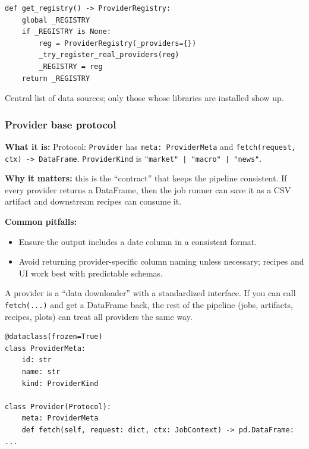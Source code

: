 \documentclass[11pt,a4paper]{article}
\begin{document}
\begin{lstlisting}
def get_registry() -> ProviderRegistry:
    global _REGISTRY
    if _REGISTRY is None:
        reg = ProviderRegistry(_providers={})
        _try_register_real_providers(reg)
        _REGISTRY = reg
    return _REGISTRY
\end{lstlisting}

\begin{intuitionbox}
Central list of data sources; only those whose libraries are installed show up.
\end{intuitionbox}

\subsubsection{Provider base protocol}\label{sec:provider-base}

\textbf{What it is:} Protocol: \texttt{Provider} has \texttt{meta: ProviderMeta} and \texttt{fetch(request, ctx) -> DataFrame}. \texttt{ProviderKind} is \texttt{"market" | "macro" | "news"}.

\textbf{Why it matters:} this is the ``contract'' that keeps the pipeline consistent. If every provider returns a DataFrame, then the job runner can save it as a CSV artifact and downstream recipes can consume it.

\textbf{Common pitfalls:}
\begin{itemize}[leftmargin=2em]
  \item Ensure the output includes a date column in a consistent format.
  \item Avoid returning provider-specific column naming unless necessary; recipes and UI work best with predictable schemas.
\end{itemize}

\begin{intuitionbox}
A provider is a ``data downloader'' with a standardized interface. If you can call \texttt{fetch(...)} and get a DataFrame back, the rest of the pipeline (jobs, artifacts, recipes, plots) can treat all providers the same way.
\end{intuitionbox}

\begin{lstlisting}
@dataclass(frozen=True)
class ProviderMeta:
    id: str
    name: str
    kind: ProviderKind

class Provider(Protocol):
    meta: ProviderMeta
    def fetch(self, request: dict, ctx: JobContext) -> pd.DataFrame: ...
\end{lstlisting}
\end{document}
